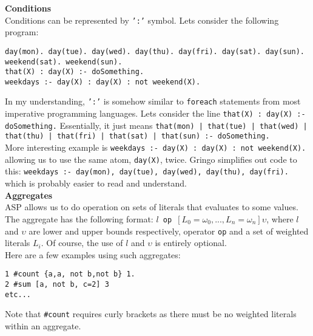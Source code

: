 \documentclass[11pt]{article}
\begin{document}
\textbf{Conditions}\\
Conditions can be represented by \texttt{':'} symbol. Lets consider the following program:
\begin{lstlisting}
day(mon). day(tue). day(wed). day(thu). day(fri). day(sat). day(sun).
weekend(sat). weekend(sun).
that(X) : day(X) :- doSomething.
weekdays :- day(X) : day(X) : not weekend(X).
\end{lstlisting}
In my understanding, \texttt{':'} is somehow similar to 
\texttt{foreach} statements from most imperative programming languages. 
Lets consider the line \texttt{that(X) : day(X) :- doSomething.} 
Essentially, it just means 
\texttt{that(mon) | that(tue) | that(wed) | that(thu) | that(fri) | that(sat) | that(sun) :- doSomething.}\\
More interesting example is \texttt{weekdays :- day(X) : day(X) : not weekend(X).} allowing us to use the same atom, \texttt{day(X)}, twice. Gringo simplifies out code to this:  \texttt{weekdays :- day(mon), day(tue), day(wed), day(thu), day(fri).} which is probably easier to read and understand.\\

\textbf{Aggregates}\\
ASP allows us to do operation on sets of literals that evaluates to some values. The aggregate has the following format: $l$\texttt{ op }$[L_0 = \omega_0 , ... , L_n = \omega_n] \upsilon$, where $l$ and $\upsilon$ are lower and upper bounds respectively, operator \texttt{op} and a set of weighted literals $L_i$. Of course, the use of $l$ and $\upsilon$ is entirely optional.\\
Here are a few examples using such aggregates:\\
\begin{lstlisting}
1 #count {a,a, not b,not b} 1.
2 #sum [a, not b, c=2] 3
etc...
\end{lstlisting}
Note that \texttt{\#count} requires curly brackets as there must be no weighted literals within an aggregate.\\
\end{document}
